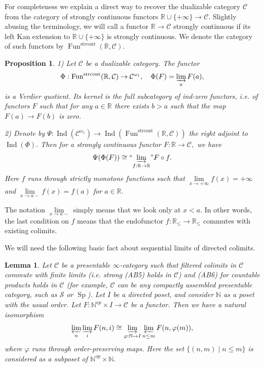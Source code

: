 \documentclass[11pt,leqno]{amsart}
\newtheorem{lemma}[theo]{Lemma}
\newtheorem{prop}[theo]{Proposition}
\numberwithin{equation}{section}
\def\N{\mathbb{N}}
\def\R{\mathbb{R}}
\newcommand{\indlim}[1][]{\mathop{\varinjlim}\limits_{#1}}
\newcommand{\inddlim}[1][]{{``{\indlim[#1]}"}}
\newcommand{\prolim}[1][]{\mathop{\varprojlim}\limits_{#1}}
\newcommand{\strcont}{\operatorname{strcont}}
\newcommand{\cC}{{\mathcal C}}
\newcommand{\cS}{{\mathcal S}}
\newcommand{\Fun}{\operatorname{Fun}}
\newcommand{\Sp}{\operatorname{Sp}}
\newcommand{\Ind}{\operatorname{Ind}}
\begin{document}
For completeness we explain a direct way to recover the dualizable category $\cC$ from the category of strongly continuous functors $\R\cup\{+\infty\}\to\cC.$ Slightly abusing the terminology, we will call a functor $\R\to\cC$ strongly continuous if its left Kan extension to $\R\cup\{+\infty\}$ is strongly continuous. We denote the category of such functors by
$\Fun^{\strcont}(\R,\cC).$

\begin{prop}\label{prop:Urysohn_explicit} 1) Let $\cC$ be a dualizable category. The functor $$\Phi:\Fun^{\strcont}(\R,\cC)\to\cC^{\omega_1},\quad\Phi(F)=\indlim[a]F(a),$$ is a Verdier quotient. Its kernel is the full subcategory of ind-zero functors, i.e. of functors $F$ such that for any $a\in\R$ there exists $b>a$ such that the map $F(a)\to F(b)$ is zero.

2) Denote by $\Psi:\Ind(\cC^{\omega_1})\to \Ind(\Fun^{\strcont}(\R,\cC))$ the right adjoint to $\Ind(\Phi).$ Then for a strongly continuous functor $F:\R\to\cC,$ we have
\begin{equation}\label{eq:right_adjoint_explicit} \Psi(\Phi(F))\cong \inddlim[f:\R\to\R]F\circ f.\end{equation}
Here $f$ runs through strictly monotone functions such that $\lim\limits_{x\to +\infty}f(x)=+\infty$ and $\lim\limits_{x\to a-}f(x)=f(a)$ for $a\in\R.$\end{prop} 

The notation $\lim\limits_{x\to a-}$ simply means that we look only at $x<a.$ In other words, the last condition on $f$ means that the endofunctor $f:\R_{\leq}\to\R_{\leq}$ commutes with existing colimits.

We will need the following basic fact about sequential limits of directed colimits.

\begin{lemma}\label{lem:seq_limits_of_filtered_colimits} Let $\cC$ be a presentable $\infty$-category such that filtered colimits in $\cC$ commute with finite limits (i.e. strong (AB5) holds in $\cC$) and (AB6) for countable products holds in $\cC$ (for example, $\cC$ can be any compactly assembled presentable category, such as $\cS$ or $\Sp$). Let $I$ be a directed poset, and consider $\N$ as a poset with the usual order. Let $F:\N^{op}\times I\to \cC$ be a functor. Then we have a natural isomorphism
$$\prolim[n]\indlim[i]F(n,i)\cong\indlim[\varphi:\N\to I]\prolim[n\leq m]F(n,\varphi(m)),$$
where $\varphi$ runs through order-preserving maps.
Here the set $\{(n,m)\mid n\leq m\}$ is considered as a subposet of $\N^{op}\times\N.$\end{lemma}
\end{document}
